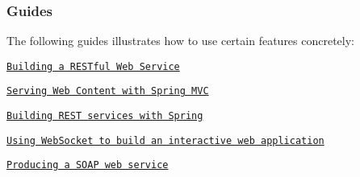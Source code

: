 \subsubsection*{Guides}

The following guides illustrates how to use certain features concretely\+:


\begin{DoxyItemize}
\item \href{https://spring.io/guides/gs/rest-service/}{\tt Building a R\+E\+S\+Tful Web Service}
\item \href{https://spring.io/guides/gs/serving-web-content/}{\tt Serving Web Content with Spring M\+VC}
\item \href{https://spring.io/guides/tutorials/bookmarks/}{\tt Building R\+E\+ST services with Spring}
\item \href{https://spring.io/guides/gs/messaging-stomp-websocket/}{\tt Using Web\+Socket to build an interactive web application}
\item \href{https://spring.io/guides/gs/producing-web-service/}{\tt Producing a S\+O\+AP web service} 
\end{DoxyItemize}